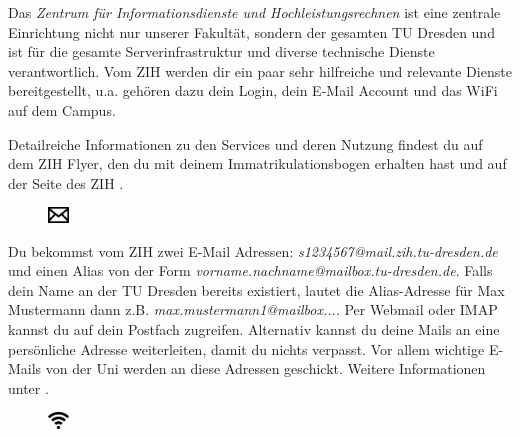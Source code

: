 
Das \textit{Zentrum für Informationsdienste und Hochleistungsrechnen} ist eine zentrale Einrichtung nicht nur unserer Fakultät, sondern der gesamten TU Dresden und ist für die gesamte Serverinfrastruktur und diverse technische Dienste verantwortlich. Vom ZIH werden dir ein paar sehr hilfreiche und relevante Dienste bereitgestellt, u.a. gehören dazu dein Login, dein E-Mail Account und das WiFi auf dem Campus.

Detailreiche Informationen zu den Services und deren Nutzung findest du auf dem ZIH Flyer, den du mit deinem Immatrikulationsbogen erhalten hast und auf der Seite des ZIH .

\begin{figure}
  \vspace{-14pt}
  \begin{centering}
    \includegraphics[width=0.05\textwidth]{img/icons/email.pdf}
  \end{centering}
  \vspace{-20pt}
\end{figure}

Du bekommst vom ZIH zwei E-Mail Adressen:
\textit{s1234567@mail.zih.tu-dresden.de} und einen Alias von der Form \textit{vorname.nachname@mailbox.tu-dresden.de}.
Falls dein Name an der TU Dresden bereits existiert, lautet die Alias-Adresse für Max Mustermann dann z.B. \textit{max.mustermann1@mailbox...}.
Per Webmail oder IMAP kannst du auf dein Postfach zugreifen.
Alternativ kannst du deine Mails an eine persönliche Adresse weiterleiten, damit du nichts verpasst.
Vor allem wichtige E-Mails von der Uni werden an diese Adressen geschickt. Weitere Informationen unter .


\begin{figure}
  \vspace{-14pt}
  \begin{centering}
    \includegraphics[width=0.05\textwidth]{img/icons/wifi.pdf}
  \end{centering}
  \vspace{-20pt}
\end{figure}

